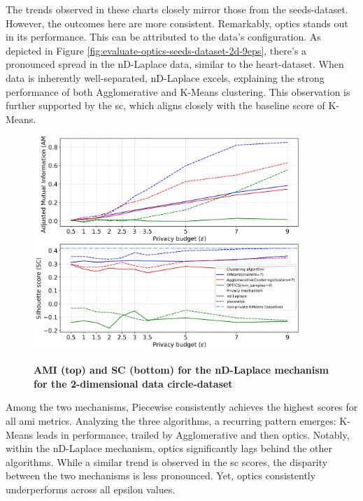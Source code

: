 The trends observed in these charts closely mirror those from the seeds-dataset. However, the outcomes here are more consistent. 
Remarkably, \gls{optics} stands out in its performance. This can be attributed to the data's configuration. 
As depicted in Figure \ref{fig:evaluate-optics-seeds-dataset-2d-9eps}, there's a pronounced spread in the nD-Laplace data, similar to the heart-dataset. 
When data is inherently well-separated, nD-Laplace excels, explaining the strong performance of both Agglomerative and K-Means clustering. 
This observation is further supported by the \gls{sc}, which aligns closely with the baseline score of K-Means.
\newpage
\begin{figure}[H]
  \centering
  \caption{\textbf{AMI (top) and SC (bottom) for the nD-Laplace mechanism for the 2-dimensional data circle-dataset}}
  \includegraphics[width=0.9\textwidth]{Results/nd-laplace/nd-Laplace/circle-dataset/ami-and-sc_2_dimensions.png}
  \label{fig:validation-circle-dataset_comparison_2d-laplace}
\end{figure}
Among the two mechanisms, Piecewise consistently achieves the highest scores for all \gls{ami} metrics. Analyzing the three algorithms, a recurring pattern emerges: K-Means leads in performance, trailed by Agglomerative and then \gls{optics}. Notably, within the nD-Laplace mechanism, \gls{optics} significantly lags behind the other algorithms. While a similar trend is observed in the \gls{sc} scores, the disparity between the two mechanisms is less pronounced. Yet, \gls{optics} consistently underperforms across all epsilon values.

